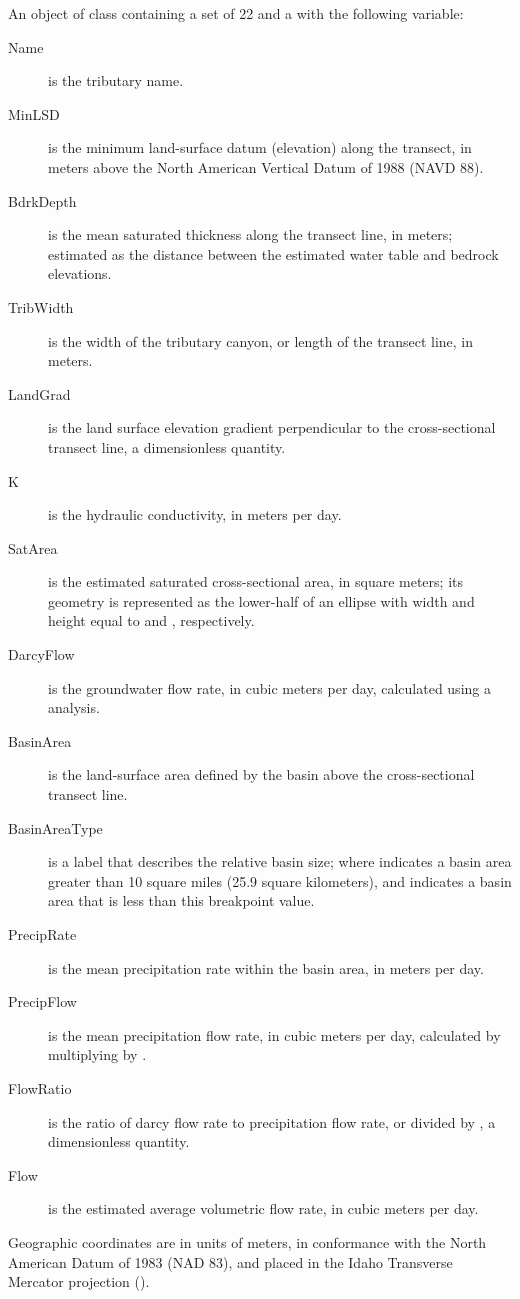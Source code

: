 \documentclass[letterpaper]{book}
\begin{document}
\begin{Format}
An object of  class containing a set of 22  and a  with the following variable:
\begin{description}

\item[Name] is the tributary name.
\item[MinLSD] is the minimum land-surface datum (elevation) along the transect, in meters above the North American Vertical Datum of 1988 (NAVD 88).
\item[BdrkDepth] is the mean saturated thickness along the transect line, in meters; estimated as the distance between the estimated water table and bedrock elevations.
\item[TribWidth] is the width of the tributary canyon, or length of the transect line, in meters.
\item[LandGrad] is the land surface elevation gradient perpendicular to the cross-sectional transect line, a dimensionless quantity.
\item[K] is the hydraulic conductivity, in meters per day.
\item[SatArea] is the estimated saturated cross-sectional area, in square meters; its geometry is represented as the lower-half of an ellipse with width and height equal to  and , respectively.
\item[DarcyFlow] is the groundwater flow rate, in cubic meters per day, calculated using a  analysis.
\item[BasinArea] is the land-surface area defined by the basin above the cross-sectional transect line.
\item[BasinAreaType] is a label that describes the relative basin size; where  indicates a basin area greater than 10 square miles (25.9 square kilometers), and  indicates a basin area that is less than this breakpoint value.
\item[PrecipRate] is the mean precipitation rate within the basin area, in meters per day.
\item[PrecipFlow] is the mean precipitation flow rate, in cubic meters per day, calculated by multiplying  by .
\item[FlowRatio] is the ratio of darcy flow rate to precipitation flow rate, or  divided by , a dimensionless quantity.
\item[Flow] is the estimated average volumetric flow rate, in cubic meters per day.

\end{description}

Geographic coordinates are in units of meters, in conformance with the North American Datum of 1983 (NAD 83), and placed in the
Idaho Transverse Mercator projection ().
\end{Format}
\end{document}
